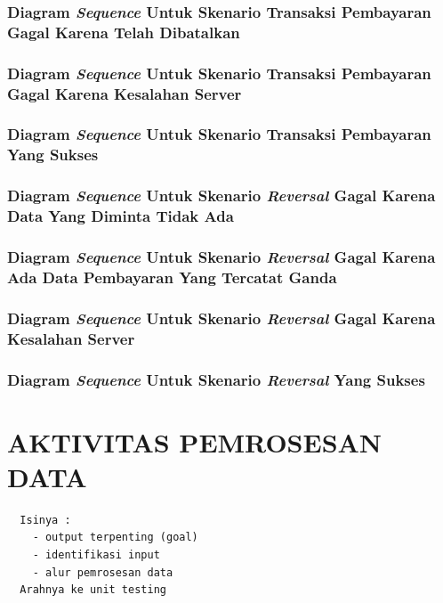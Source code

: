 \documentclass[pdftex,12pt, oneside]{article}
\begin{document}
\subsubsection{Diagram \textit{Sequence} Untuk Skenario Transaksi Pembayaran Gagal Karena Telah Dibatalkan}
\subsubsection{Diagram \textit{Sequence} Untuk Skenario Transaksi Pembayaran Gagal Karena Kesalahan Server}
\subsubsection{Diagram \textit{Sequence} Untuk Skenario Transaksi Pembayaran Yang Sukses}
\subsubsection{Diagram \textit{Sequence} Untuk Skenario \textit{Reversal} Gagal Karena Data Yang Diminta Tidak Ada}
\subsubsection{Diagram \textit{Sequence} Untuk Skenario \textit{Reversal} Gagal Karena Ada Data Pembayaran Yang Tercatat Ganda}
\subsubsection{Diagram \textit{Sequence} Untuk Skenario \textit{Reversal} Gagal Karena Kesalahan Server}
\subsubsection{Diagram \textit{Sequence} Untuk Skenario \textit{Reversal} Yang Sukses}


\section{AKTIVITAS PEMROSESAN DATA}

\begin{verbatim}
  Isinya :
    - output terpenting (goal)
    - identifikasi input 
    - alur pemrosesan data
  Arahnya ke unit testing
\end{verbatim}
\end{document}
